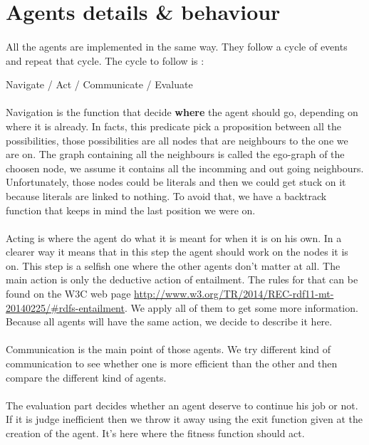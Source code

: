 \documentclass{article}
\begin{document}
\newpage
\section{Agents details \& behaviour}
	\paragraph{}
		All the agents are implemented in the same way.
		They follow a cycle of events and repeat that cycle.
		The cycle to follow is :
	\begin{center}
		Navigate / Act / Communicate / Evaluate
	\end{center}
	\paragraph{}
		Navigation is the function that decide \textbf{where} the agent should go, depending on where it is already.
		In facts, this predicate pick a proposition between all the possibilities,
		those possibilities are all nodes that are neighbours to the one we are on.
		The graph containing all the neighbours is called the ego-graph of the choosen node,
		we assume it contains all the incomming and out going neighbours.
		Unfortunately, those nodes could be literals and then we could get stuck on it because literals are linked to nothing.
		To avoid that, we have a backtrack function that keeps in mind the last position we were on.
	\paragraph{}
		Acting is where the agent do what it is meant for when it is on his own.
		In a clearer way it means that in this step the agent should work on the nodes it is on.
		This step is a selfish one where the other agents don't matter at all.
		The main action is only the deductive action of entailment.
		The rules for that can be found on the W3C web page \url{http://www.w3.org/TR/2014/REC-rdf11-mt-20140225/#rdfs-entailment}.
		We apply all of them to get some more information.
		Because all agents will have the same action, we decide to describe it here.
	\paragraph{}
		Communication is the main point of those agents.
		We try different kind of communication to see whether one is more efficient than the other
		and then compare the different kind of agents.
	\paragraph{}
		The evaluation part decides whether an agent deserve to continue his job or not.
		If it is judge inefficient then we throw it away using the exit function given at the creation of the agent.
		It's here where the fitness function should act.
\end{document}
